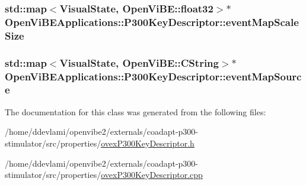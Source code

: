 \label{classOpenViBEApplications_1_1P300KeyDescriptor_acb8b5f94f436944aa5c528bb9d3601b8}
\hypertarget{classOpenViBEApplications_1_1P300KeyDescriptor_ae65d2d67876a985384a682b7fc47eda2}{
\subsubsection[{eventMapScaleSize}]{\setlength{\rightskip}{0pt plus 5cm}std::map$<${\bf VisualState}, OpenViBE::float32$>$$\ast$ {\bf OpenViBEApplications::P300KeyDescriptor::eventMapScaleSize}}}
\label{classOpenViBEApplications_1_1P300KeyDescriptor_ae65d2d67876a985384a682b7fc47eda2}
\hypertarget{classOpenViBEApplications_1_1P300KeyDescriptor_aaff43e7c9da92565ed47d181c4c69b33}{
\subsubsection[{eventMapSource}]{\setlength{\rightskip}{0pt plus 5cm}std::map$<${\bf VisualState}, OpenViBE::CString$>$$\ast$ {\bf OpenViBEApplications::P300KeyDescriptor::eventMapSource}}}
\label{classOpenViBEApplications_1_1P300KeyDescriptor_aaff43e7c9da92565ed47d181c4c69b33}


The documentation for this class was generated from the following files:\begin{DoxyCompactItemize}
\item 
/home/ddevlami/openvibe2/externals/coadapt-\/p300-\/stimulator/src/properties/\hyperlink{ovexP300KeyDescriptor_8h}{ovexP300KeyDescriptor.h}\item 
/home/ddevlami/openvibe2/externals/coadapt-\/p300-\/stimulator/src/properties/\hyperlink{ovexP300KeyDescriptor_8cpp}{ovexP300KeyDescriptor.cpp}\end{DoxyCompactItemize}
